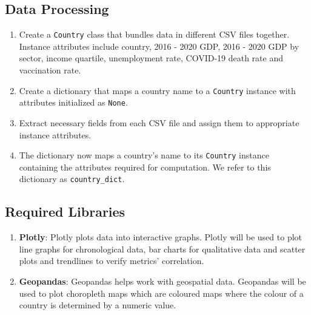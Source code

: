 \documentclass[fontsize=11pt]{article}
\begin{document}
    \subsection*{Data Processing}
    \begin{enumerate}
        \item Create a \texttt{Country} class that bundles data in different CSV files together. Instance attributes include country, 2016 - 2020 GDP, 2016 - 2020 GDP by sector, income quartile, unemployment rate, COVID-19 death rate and vaccination rate.
        \item Create a dictionary that maps a country name to a \texttt{Country} instance with attributes initialized as \texttt{None}.
        \item Extract necessary fields from each CSV file and assign them to appropriate instance attributes.
        \item The dictionary now maps a country's name to its \texttt{Country} instance containing the attributes required for computation. We refer to this dictionary as \texttt{country\_dict}.
    \end{enumerate}

    \subsection*{Required Libraries}
    \begin{enumerate}
        \item \textbf{Plotly}: Plotly plots data into interactive graphs. Plotly will be used to plot line graphs for chronological data, bar charts for qualitative data and scatter plots and trendlines to verify metrics' correlation.
        \item \textbf{Geopandas}: Geopandas helps work with geospatial data. Geopandas will be used to plot choropleth maps which are coloured maps where the colour of a country is determined by a numeric value.
    \end{enumerate}
\end{document}
